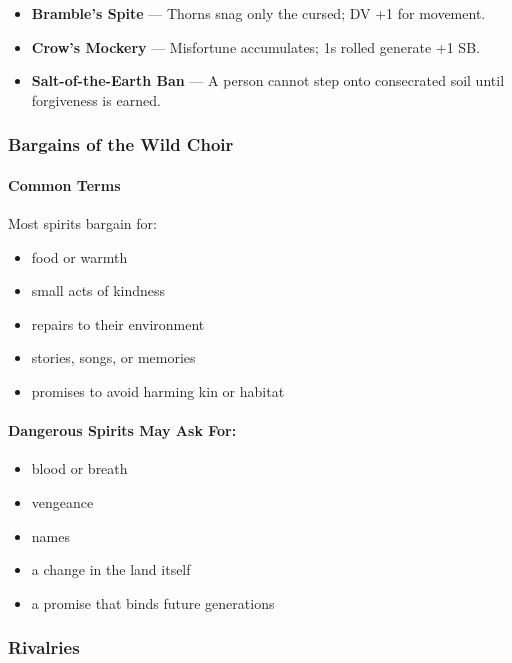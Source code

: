 \documentclass[11pt]{book}
\begin{document}
    \begin{itemize}[leftmargin=1.5em]
      \item \textbf{Bramble's Spite} --- Thorns snag only the cursed; DV +1 for movement.
      \item \textbf{Crow's Mockery} --- Misfortune accumulates; 1s rolled generate +1 SB.
      \item \textbf{Salt-of-the-Earth Ban} --- A person cannot step onto consecrated soil until forgiveness is earned.
    \end{itemize}
    
    \subsubsection*{Bargains of the Wild Choir}
    
    \paragraph{Common Terms}
    Most spirits bargain for:
    \begin{itemize}[leftmargin=1.5em]
      \item food or warmth  
      \item small acts of kindness  
      \item repairs to their environment  
      \item stories, songs, or memories  
      \item promises to avoid harming kin or habitat  
    \end{itemize}
    
    \paragraph{Dangerous Spirits May Ask For:}
    \begin{itemize}[leftmargin=1.5em]
      \item blood or breath  
      \item vengeance  
      \item names  
      \item a change in the land itself  
      \item a promise that binds future generations  
    \end{itemize}
    
    \subsubsection*{Rivalries}
    
\end{document}
